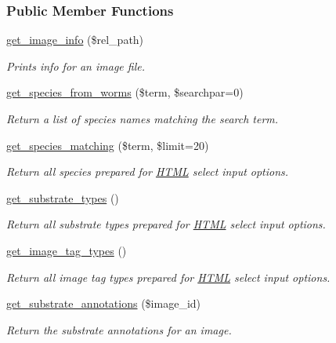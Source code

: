 \subsubsection*{Public Member Functions}
\begin{DoxyCompactItemize}
\item 
\hyperlink{classJSON_a66b5ebb4e30753852638dbbf0d53e799}{get\-\_\-image\-\_\-info} (\$rel\-\_\-path)
\begin{DoxyCompactList}\small\item\em Prints info for an image file. \end{DoxyCompactList}\item 
\hyperlink{classJSON_a1f9cea49a726222ca98b6df75efbb0df}{get\-\_\-species\-\_\-from\-\_\-worms} (\$term, \$searchpar=0)
\begin{DoxyCompactList}\small\item\em Return a list of species names matching the search term. \end{DoxyCompactList}\item 
\hyperlink{classJSON_a1c6b7055dca8f87c890dd1a3dc6b4c09}{get\-\_\-species\-\_\-matching} (\$term, \$limit=20)
\begin{DoxyCompactList}\small\item\em Return all species prepared for \hyperlink{classHTML}{H\-T\-M\-L} select input options. \end{DoxyCompactList}\item 
\hyperlink{classJSON_a3dc5fecab5727b9e24af963f98ae7ed3}{get\-\_\-substrate\-\_\-types} ()
\begin{DoxyCompactList}\small\item\em Return all substrate types prepared for \hyperlink{classHTML}{H\-T\-M\-L} select input options. \end{DoxyCompactList}\item 
\hyperlink{classJSON_ae455596a746767bc1ed3805a2770be69}{get\-\_\-image\-\_\-tag\-\_\-types} ()
\begin{DoxyCompactList}\small\item\em Return all image tag types prepared for \hyperlink{classHTML}{H\-T\-M\-L} select input options. \end{DoxyCompactList}\item 
\hyperlink{classJSON_a8e8a4959e85674496ec7ffa0adb8ef9c}{get\-\_\-substrate\-\_\-annotations} (\$image\-\_\-id)
\begin{DoxyCompactList}\small\item\em Return the substrate annotations for an image. \end{DoxyCompactList}\item 

\end{DoxyCompactItemize}
